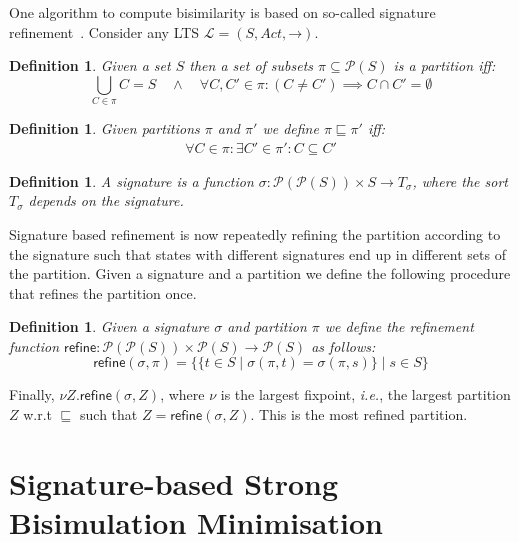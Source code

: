 \documentclass[a4paper]{article}
\newcommand{\ie}{\emph{i.e.}}
\newcommand{\partition}{\pi}
\newcommand{\signature}{\sigma}
\newcommand{\lts}{\mathcal{L}}
\newcommand{\states}{S}
\newcommand{\actions}{\mathit{Act}}
\newcommand{\transitions}{\mathbin{\rightarrow}}
\newcommand{\set}[1]{\mathcal{P}(#1)}
\newcommand{\refine}{\textsf{refine}}
\newtheorem{definition}[theorem]{Definition}
\begin{document}
One algorithm to compute bisimilarity is based on so-called signature refinement~\cite{WimmerHHSB06}.
Consider any LTS $\lts = (\states, \actions, \transitions)$.

\begin{definition}
  Given a set $S$ then a set of subsets $\partition \subseteq \set{\states}$ is a \emph{partition} iff:
  \begin{equation*}
    \bigcup_{C \in \partition} C = \states \quad \land \quad \forall C, C' \in \partition : (C \neq C') \implies C \cap C' = \emptyset
  \end{equation*}
\end{definition}


\begin{definition}
  Given partitions $\partition$ and $\partition'$ we define $\partition \sqsubseteq \partition'$ iff:
  \begin{align*}
    \forall C \in \partition : \exists C' \in \partition' : C \subseteq C'
  \end{align*}
\end{definition}

\begin{definition}
  A \emph{signature} is a function $\signature : \set{\set{\states}} \times \states \rightarrow T_\signature$, where the sort $T_\signature$ depends on the signature.
\end{definition}

Signature based refinement is now repeatedly refining the partition according to the signature such that states with different signatures end up in different sets of the partition.
Given a signature and a partition we define the following procedure that refines the partition once.
\begin{definition}
  Given a signature $\signature$ and partition $\partition$ we define the refinement function $\refine : \set{\set{\states}} \times \set{\states} \rightarrow \set{\states}$ as follows:
  \begin{equation*}
    \refine(\signature, \partition) = \{ \{ t \in S \mid \signature(\partition, t) = \signature(\partition, s) \} \mid s \in S \}
  \end{equation*}
\end{definition}
Finally, $\nu Z . \refine(\signature, Z)$, where $\nu$ is the largest fixpoint, \ie, the largest partition $Z$ w.r.t $\sqsubseteq$ such that $Z = \refine(\signature, Z)$.
This is the most refined partition.

\section{Signature-based Strong Bisimulation Minimisation}
\end{document}
